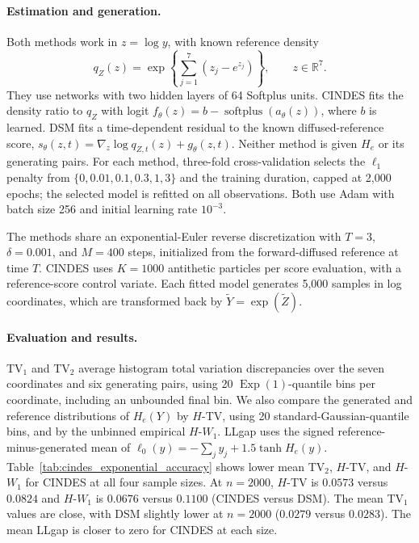 \paragraph{Estimation and generation.}
Both methods work in $z=\log y$, with known reference density
\begin{equation}
 q_Z(z)=\exp\left\{\sum_{j=1}^7(z_j-e^{z_j})\right\},
 \qquad z\in\mathbb R^7.
 \label{eq:supp_log_exponential_reference}
\end{equation}
They use networks with two hidden layers of 64 Softplus units. CINDES fits
the density ratio to $q_Z$ with logit
$f_\theta(z)=b-\operatorname{softplus}(a_\theta(z))$, where $b$ is learned.
DSM fits a time-dependent residual to the known diffused-reference score,
$s_\theta(z,t)=\nabla_z\log q_{Z,t}(z)+g_\theta(z,t)$. Neither method is
given $H_e$ or its generating pairs. For each method, three-fold
cross-validation selects the $\ell_1$ penalty from
$\{0,0.01,0.1,0.3,1,3\}$ and the training duration, capped at 2,000
epochs; the selected model is refitted on all observations. Both use Adam
with batch size 256 and initial learning rate $10^{-3}$.

The methods share an exponential-Euler reverse discretization with $T=3$,
$\delta=0.001$, and $M=400$ steps, initialized from the forward-diffused
reference at time $T$. CINDES uses $K=1000$ antithetic particles per score
evaluation, with a reference-score control variate. Each fitted model
generates 5,000 samples in log coordinates, which are transformed back by
$\widetilde Y=\exp(\widetilde Z)$.

\paragraph{Evaluation and results.}
TV$_1$ and TV$_2$ average histogram total variation discrepancies over the
seven coordinates and six generating pairs, using 20
$\operatorname{Exp}(1)$-quantile bins per coordinate, including an unbounded
final bin. We also compare the generated and reference distributions of
$H_e(Y)$ by $H$-TV, using 20 standard-Gaussian-quantile bins, and by the
unbinned empirical $H$-$W_1$. LLgap uses the signed reference-minus-generated
mean of $\ell_0(y)=-\sum_j y_j+1.5\tanh H_e(y)$. Table~\ref{tab:cindes_exponential_accuracy}
shows lower mean TV$_2$, $H$-TV, and $H$-$W_1$ for CINDES at all four sample
sizes. At $n=2000$, $H$-TV is $0.0573$ versus $0.0824$ and $H$-$W_1$
is $0.0676$ versus $0.1100$ (CINDES versus DSM). The mean TV$_1$
values are close, with DSM slightly lower at $n=2000$ ($0.0279$ versus
$0.0283$). The mean LLgap is closer to zero for CINDES at each size.

